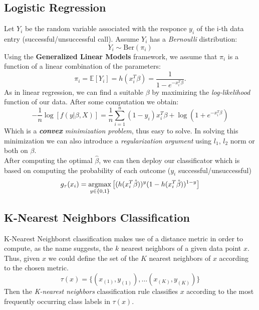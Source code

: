 \subsection{Logistic Regression}
Let \(Y_i\) be the random variable associated with the responce \(y_i\) of the i-th data entry (successful/unsuccessful call). Assume \(Y_i\) has a \textit{Bernoulli} distribution:
\begin{equation}
    Y_i \sim \text{Ber}(\pi_i)
\end{equation}
Using the \textbf{Generalized Linear Models} framework, we assume that \(\pi_i\) is a function of a linear combination of the parameters:
\begin{equation}
    \pi_i = \mathbb{E}[Y_i] = h(x_i^T\beta) = \frac{1}{1- e^{- x_i^T\beta}}.
\end{equation}
As in linear regression, we can find a suitable \(\beta\) by maximizing the \textit{log-likelihood} function of our data. After some computation we obtain:
\begin{equation}
    -\frac{1}{n} \log[f(y|\beta,X)] = \frac{1}{n}  \sum \limits_{i= 1}^{n} (1- y_i) x_i^T \beta + \log(1+ e^{- x_i^T\beta})
\end{equation}
Which is a \textit{\textbf{convex} minimization problem}, thus easy to solve. In solving this minimization we can also introduce a \textit{regularization argument} using \(l_1\), \(l_2\) norm or both on \(\beta\).\\
After computing the optimal \(\hat{\beta}\), we can then deploy our classificator which is based on computing the probability of each outcome (\(y_i\) successful/unsuccessful)
\begin{equation}
    g_\tau(x_i) = \operatorname*{argmax}_{y \in \{0, 1\}} \big[ (h(x_i^T\hat{\beta}))^{y}(1-h(x_i^T\hat{\beta}))^{1- y} \big] 
\end{equation}

\subsection{K-Nearest Neighbors Classification}
K-Nearest Neighborst classification makes use of a distance metric in order to compute, as the name suggests, the \(k\) nearest neighbors of a given data point \(x\). Thus, given \(x\) we could define the set of the \(K\) nearest neighbors of \(x\) according to the chosen metric. 
\begin{equation*}
    \tau(x) =\{ (x_{(1)}, y_{(1)}), \dots (x_{(K)}, y_{(K)})\}
\end{equation*}
Then the \textit{K-nearest neighbors} classification rule classifies \(x\) according to the most frequently occurring class labels in \(\tau(x)\).